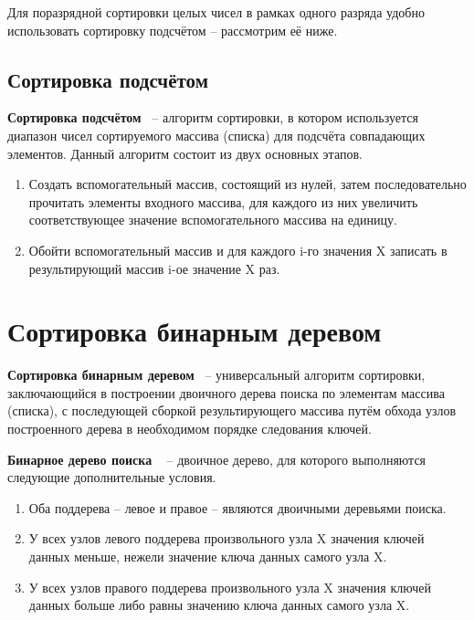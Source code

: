Для поразрядной сортировки целых чисел в рамках одного разряда удобно использовать сортировку подсчётом -- рассмотрим её ниже.

\subsection{Сортировка подсчётом}

\textbf{Сортировка подсчётом}~\cite{radix-sort}  --  алгоритм сортировки, в котором используется диапазон чисел сортируемого массива (списка) для подсчёта совпадающих элементов. Данный алгоритм состоит из двух основных этапов.
\begin{enumerate}
	\item Создать вспомогательный массив, состоящий из нулей, затем последовательно прочитать элементы входного массива, для каждого из них увеличить соответствующее значение вспомогательного массива на единицу.
	\item Обойти  вспомогательный массив и для каждого i-го значения X записать в результирующий массив i-ое значение X раз.
\end{enumerate}

\section{Сортировка бинарным деревом}
\textbf{Сортировка бинарным деревом}~\cite{bst-sort}  -- универсальный алгоритм сортировки, заключающийся в построении двоичного дерева поиска по элементам массива (списка), с последующей сборкой результирующего массива путём обхода узлов построенного дерева в необходимом порядке следования ключей.
	

\textbf{Бинарное дерево поиска }~\cite{bst-sort}  -- двоичное дерево, для которого выполняются следующие дополнительные условия.
\begin{enumerate}
	\item Оба поддерева -- левое и правое -- являются двоичными деревьями поиска.
	\item У всех узлов левого поддерева произвольного узла X значения ключей данных меньше, нежели значение ключа данных самого узла X.
	\item У всех узлов правого поддерева произвольного узла X значения ключей данных больше либо равны значению ключа данных самого узла X.
\end{enumerate}



